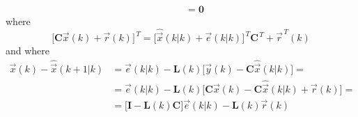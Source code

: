 \documentclass[12pt,a4paper,oneside]{book}
\begin{document}
\begin{onehalfspace}
\begin{equation}
\begin{aligned}
		&\qquad=\mathbf{0}
	\end{aligned}
\end{equation}
where 
\begin{equation*}
	\Big[\mathbf{C}\vec{x}(k)+\vec{r}(k)\Big]^{\,T} = 
	\Big[\hat{\vec{x}}(k|k)+\vec{e}(k|k)\Big]^{\,T}\mathbf{C}^{\,T}+\vec{r}^{\,T}(k)
\end{equation*}
and where
\begin{equation*}
	\begin{aligned}
		\vec{x}(k)-\hat{\vec{x}}(k+1|k) &= \vec{e}(k|k) - 
		\mathbf{L}(k)\Big[\vec{y}(k)-\mathbf{C}\hat{\vec{x}}(k|k)\Big] = \\[6pt]
		&= \vec{e}(k|k) - 
		\mathbf{L}(k)\Big[\mathbf{C}\vec{x}(k)-\mathbf{C}\hat{\vec{x}}(k|k)+\vec{r}(k)\Big]
		 = \\[6pt]
		&= \Big[\mathbf{I}-\mathbf{L}(k)\mathbf{C}\Big]\vec{e}(k|k) - 
		\mathbf{L}(k)\vec{r}(k)
	\end{aligned}
\end{equation*}


\end{onehalfspace}
\end{document}
